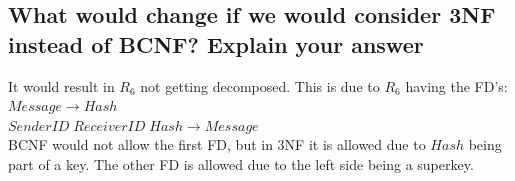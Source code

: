 \documentclass[12pt, a4paper]{article}
\begin{document}
		\subsection{What would change if we would consider 3NF instead of BCNF? Explain your answer}
			It would result in $R_6$ not getting decomposed. This is due to $R_6$  having the FD's:\\
			$Message \rightarrow Hash$\\
			$SenderID\;ReceiverID\;Hash\rightarrow Message$\\
			BCNF would not allow the first FD, but in 3NF it is allowed due to $Hash$ being part of a key. The other FD is allowed due to the left side being a superkey.
\end{document}
